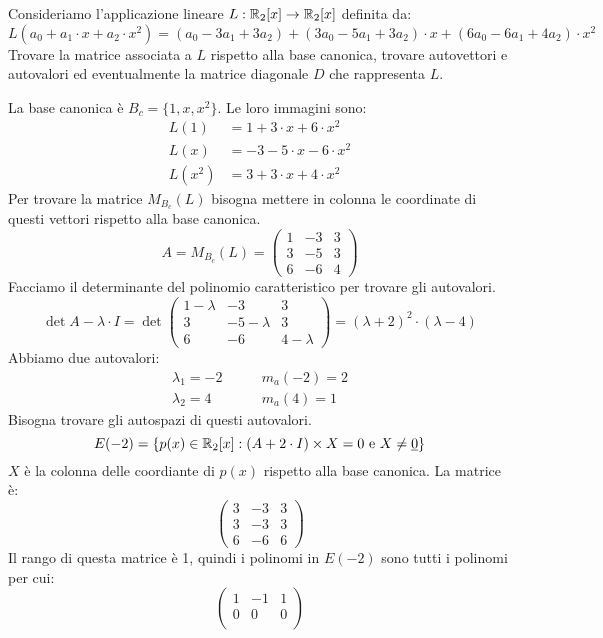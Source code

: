 \begin{exmp}
Consideriamo l'applicazione lineare $L : \mathbb{R}_2 [x] \to \mathbb{R}_2 [x]$ definita da:
\[
L(a_0 + a_1 \cdot x + a_2 \cdot x^2) =
(a_0 - 3 a_1 + 3 a_2) +
(3 a_0 - 5 a_1 + 3 a_2) \cdot x +
(6 a_0 - 6 a_1 + 4 a_2) \cdot x^2
\]
Trovare la matrice associata a $L$ rispetto alla base canonica, trovare autovettori e autovalori ed eventualmente la matrice diagonale $D$ che rappresenta $L$.

La base canonica \`e $B_c = \{ 1, x, x^2 \}$. Le loro immagini sono:
\begin{align*}
L(1) &= 1 + 3 \cdot x + 6 \cdot x^2 \\
L(x) &= -3 -5 \cdot x - 6 \cdot x^2 \\
L(x^2) &= 3 + 3 \cdot x + 4 \cdot x^2
\end{align*}
Per trovare la matrice $M_{B_c} (L)$ bisogna mettere in colonna le coordinate di questi vettori rispetto alla base canonica.
\[
A = M_{B_c} (L) =
\begin{pmatrix}
1 & -3 & 3 \\
3 & -5 & 3 \\
6 & -6 & 4
\end{pmatrix}
\]
Facciamo il determinante del polinomio caratteristico per trovare gli autovalori.
\[
\det{A - \lambda \cdot I} = 
\det{
\begin{pmatrix}
1-\lambda & -3 & 3 \\
3 & -5 - \lambda & 3 \\
6 & -6 & 4 - \lambda
\end{pmatrix}
}
=
(\lambda + 2)^2 \cdot (\lambda - 4)
\]
Abbiamo due autovalori:
\begin{align*}
\lambda_1 = -2 &\qquad m_a(-2) = 2 \\
\lambda_2 = 4 &\qquad m_a(4) = 1
\end{align*}
Bisogna trovare gli autospazi di questi autovalori.
\[
E(-2) = \left\{ p(x) \in \mathbb{R}_2 [x] : (A + 2 \cdot I) \times X = 0 \text{ e } X \neq \underline{0} \right\}
\]
$X$ \`e la colonna delle coordiante di $p(x)$ rispetto alla base canonica. La matrice \`e:
\[
\begin{pmatrix}
3 & -3 & 3 \\
3 & -3 & 3 \\
6 & -6 & 6
\end{pmatrix}
\]
Il rango di questa matrice \`e 1, quindi i polinomi in $E(-2)$ sono tutti i polinomi per cui:
\[
\begin{pmatrix}
1 & -1 & 1 \\
0 & 0 & 0 \\

\end{pmatrix}\]
\end{exmp}
